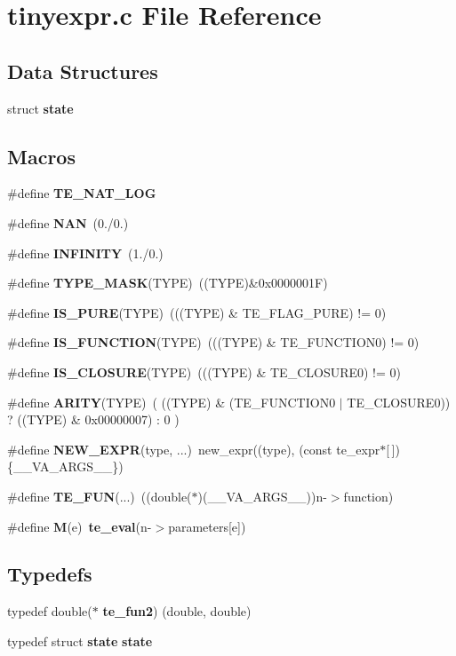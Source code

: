 \section{tinyexpr.\+c File Reference}
\label{tinyexpr_8c}
\subsection*{Data Structures}
\begin{DoxyCompactItemize}
\item 
struct {\bf state}
\end{DoxyCompactItemize}
\subsection*{Macros}
\begin{DoxyCompactItemize}
\item 
\#define {\bf T\+E\+\_\+\+N\+A\+T\+\_\+\+L\+O\+G}
\item 
\#define {\bf N\+A\+N}~(0./0.)
\item 
\#define {\bf I\+N\+F\+I\+N\+I\+T\+Y}~(1./0.)
\item 
\#define {\bf T\+Y\+P\+E\+\_\+\+M\+A\+S\+K}(T\+Y\+P\+E)~((T\+Y\+P\+E)\&0x0000001\+F)
\item 
\#define {\bf I\+S\+\_\+\+P\+U\+R\+E}(T\+Y\+P\+E)~(((T\+Y\+P\+E) \& T\+E\+\_\+\+F\+L\+A\+G\+\_\+\+P\+U\+R\+E) != 0)
\item 
\#define {\bf I\+S\+\_\+\+F\+U\+N\+C\+T\+I\+O\+N}(T\+Y\+P\+E)~(((T\+Y\+P\+E) \& T\+E\+\_\+\+F\+U\+N\+C\+T\+I\+O\+N0) != 0)
\item 
\#define {\bf I\+S\+\_\+\+C\+L\+O\+S\+U\+R\+E}(T\+Y\+P\+E)~(((T\+Y\+P\+E) \& T\+E\+\_\+\+C\+L\+O\+S\+U\+R\+E0) != 0)
\item 
\#define {\bf A\+R\+I\+T\+Y}(T\+Y\+P\+E)~( ((T\+Y\+P\+E) \& (T\+E\+\_\+\+F\+U\+N\+C\+T\+I\+O\+N0 $\vert$ T\+E\+\_\+\+C\+L\+O\+S\+U\+R\+E0)) ? ((T\+Y\+P\+E) \& 0x00000007) \+: 0 )
\item 
\#define {\bf N\+E\+W\+\_\+\+E\+X\+P\+R}(type, ...)~new\+\_\+expr((type), (const te\+\_\+expr$\ast$[$\,$])\{\+\_\+\+\_\+\+V\+A\+\_\+\+A\+R\+G\+S\+\_\+\+\_\+\})
\item 
\#define {\bf T\+E\+\_\+\+F\+U\+N}(...)~((double($\ast$)(\+\_\+\+\_\+\+V\+A\+\_\+\+A\+R\+G\+S\+\_\+\+\_\+))n-\/$>$function)
\item 
\#define {\bf M}(e)~{\bf te\+\_\+eval}(n-\/$>$parameters[e])
\end{DoxyCompactItemize}
\subsection*{Typedefs}
\begin{DoxyCompactItemize}
\item 
typedef double($\ast$ {\bf te\+\_\+fun2}) (double, double)
\item 
typedef struct {\bf state} {\bf state}
\end{DoxyCompactItemize}
